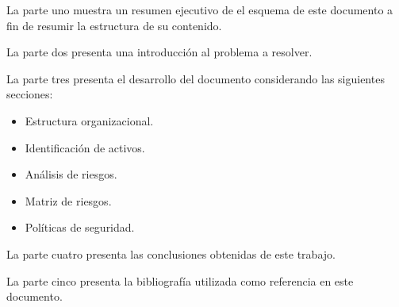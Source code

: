 La parte uno muestra un resumen ejecutivo de el esquema de este documento a fin de resumir la estructura de su contenido.

La parte dos presenta una introducción al problema a resolver.

La parte tres presenta el desarrollo del documento considerando las siguientes secciones:
\begin{itemize}
    \item Estructura organizacional.
    \item Identificación de activos.
    \item Análisis de riesgos.
    \item Matriz de riesgos.
    \item Políticas de seguridad.
\end{itemize}

La parte cuatro presenta las conclusiones obtenidas de este trabajo.

La parte cinco presenta la bibliografía utilizada como referencia en este documento.